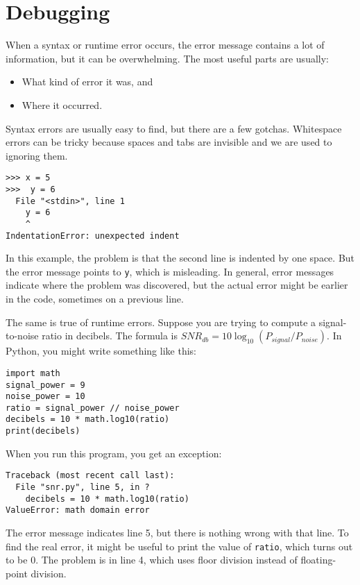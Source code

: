 \section{Debugging}
\label{whitespace}

When a syntax or runtime error occurs, the error message contains
a lot of information, but it can be overwhelming.  The most
useful parts are usually:

\begin{itemize}

\item What kind of error it was, and

\item Where it occurred.

\end{itemize}

Syntax errors are usually easy to find, but there are a few
gotchas.  Whitespace errors can be tricky because spaces and
tabs are invisible and we are used to ignoring them.

\begin{verbatim}
>>> x = 5
>>>  y = 6
  File "<stdin>", line 1
    y = 6
    ^
IndentationError: unexpected indent
\end{verbatim}
%
In this example, the problem is that the second line is indented by
one space.  But the error message points to {\tt y}, which is
misleading.  In general, error messages indicate where the problem was
discovered, but the actual error might be earlier in the code,
sometimes on a previous line.

The same is true of runtime errors.  Suppose you are trying
to compute a signal-to-noise ratio in decibels.  The formula
is $SNR_{db} = 10 \log_{10} (P_{signal} / P_{noise})$.  In Python,
you might write something like this:

\begin{verbatim}
import math
signal_power = 9
noise_power = 10
ratio = signal_power // noise_power
decibels = 10 * math.log10(ratio)
print(decibels)
\end{verbatim}
%
When you run this program, you get an exception:
%

\begin{verbatim}
Traceback (most recent call last):
  File "snr.py", line 5, in ?
    decibels = 10 * math.log10(ratio)
ValueError: math domain error
\end{verbatim}
%
The error message indicates line 5, but there is nothing
wrong with that line.  To find the real error, it might be
useful to print the value of {\tt ratio}, which turns out to
be 0.  The problem is in line 4, which uses floor division
instead of floating-point division.

